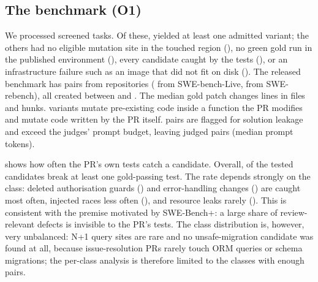 \subsection{The benchmark (O1)}
\label{sec:res-dataset}

We processed \NProcessed{} screened tasks.  Of these, \NInstances{} yielded at
least one admitted variant; the others had no eligible mutation site in the
touched region (\NStatusNoSite{}), no green gold run in the published
environment (\NStatusNotGreen{}), every candidate caught by the tests
(\NStatusCaught{}), or an infrastructure failure such as an image that did not
fit on disk (\NStatusError{}).  The released benchmark has \NPairs{} pairs from
\NRepos{} repositories (\NFromLive{} from SWE-bench-Live, \NFromRebench{} from
SWE-rebench), all created between \DateMin{} and \DateMax{}.  The median gold
patch changes \NGoldMedianLines{} lines in \NGoldMedianFiles{} files and
\NGoldMedianHunks{} hunks.  \NOriginContext{} variants mutate pre-existing code
inside a function the PR modifies and \NOriginAdded{} mutate code written by the
PR itself.  \NLeakPairs{} pairs are flagged for solution leakage and
\NTooLong{} exceed the judges' prompt budget, leaving \NPairsJudged{} judged
pairs (median prompt \NJudgedMedianTokens{} tokens).

 shows how often the PR's own tests catch a candidate.
Overall, \TestCatchRate{} of the tested candidates break at least one
gold-passing test.  The rate depends strongly on the class: deleted
authorisation guards (\CatchAuth{}) and error-handling changes (\CatchSES{})
are caught most often, injected races less often (\CatchRace{}), and resource
leaks rarely (\CatchRL{}).  This is consistent with the premise motivated by
SWE-Bench+: a large share of review-relevant defects is invisible to the
PR's tests.  The class distribution is, however, very unbalanced: N+1 query
sites are rare and no unsafe-migration candidate was found at all, because
issue-resolution PRs rarely touch ORM queries or schema migrations; the
per-class analysis is therefore limited to the classes with enough pairs.


